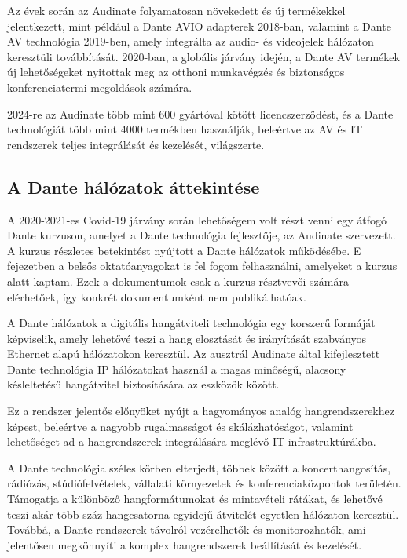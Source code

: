 Az évek során az Audinate folyamatosan növekedett és új termékekkel jelentkezett, 
mint például a Dante AVIO adapterek 2018-ban, valamint a Dante AV technológia 2019-ben, 
amely integrálta az audio- és videojelek hálózaton keresztüli továbbítását. 2020-ban, 
a globális járvány idején, a Dante AV termékek új lehetőségeket nyitottak meg az 
otthoni munkavégzés és biztonságos konferenciatermi megoldások számára.

2024-re az Audinate több mint 600 gyártóval kötött licencszerződést, és a Dante 
technológiát több mint 4000 termékben használják, beleértve az AV és IT rendszerek 
teljes integrálását és kezelését, világszerte.
\subsection{A Dante hálózatok áttekintése}
A 2020-2021-es Covid-19 járvány során lehetőségem volt részt venni egy átfogó Dante
kurzuson, amelyet a Dante technológia fejlesztője, az Audinate szervezett. A kurzus
részletes betekintést nyújtott a Dante hálózatok működésébe. E fejezetben a belsős
oktatóanyagokat is fel fogom felhasználni, amelyeket a kurzus alatt kaptam. Ezek a dokumentumok
csak a kurzus résztvevői számára elérhetőek, így konkrét dokumentumként nem publikálhatóak. 

A Dante hálózatok a digitális hangátviteli technológia egy korszerű formáját képviselik, 
amely lehetővé teszi a hang elosztását és irányítását szabványos Ethernet alapú hálózatokon 
keresztül. Az ausztrál Audinate által kifejlesztett Dante technológia IP hálózatokat használ 
a magas minőségű, alacsony késleltetésű hangátvitel biztosítására az eszközök között. 

Ez a rendszer jelentős előnyöket nyújt a hagyományos analóg hangrendszerekhez képest, 
beleértve a nagyobb rugalmasságot és skálázhatóságot, valamint lehetőséget ad a hangrendszerek 
integrálására meglévő IT infrastruktúrákba. 

A Dante technológia széles körben elterjedt, többek között a koncerthangosítás, rádiózás, 
stúdiófelvételek, vállalati környezetek és konferenciaközpontok területén. Támogatja a különböző 
hangformátumokat és mintavételi rátákat, és lehetővé teszi akár több száz hangcsatorna egyidejű 
átvitelét egyetlen hálózaton keresztül. Továbbá, a Dante rendszerek távolról vezérelhetők és 
monitorozhatók, ami jelentősen megkönnyíti a komplex hangrendszerek beállítását és kezelését.

